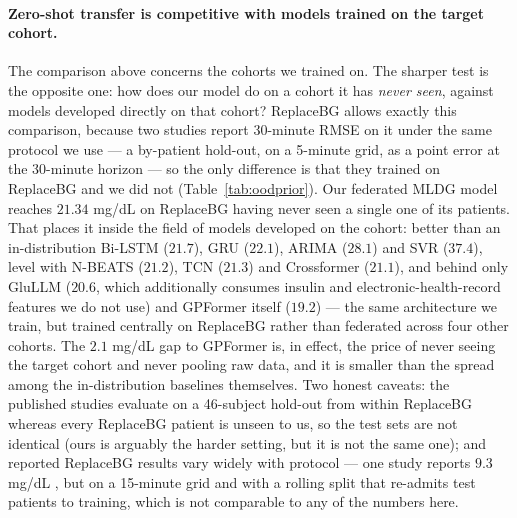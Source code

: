 \documentclass[10pt,letterpaper]{article}
\begin{document}
\paragraph{Zero-shot transfer is competitive with models trained on the target
cohort.} The comparison above concerns the cohorts we trained on. The sharper test
is the opposite one: how does our model do on a cohort it has \emph{never seen},
against models developed directly on that cohort? ReplaceBG allows exactly this
comparison, because two studies report 30-minute RMSE on it under the same
protocol we use --- a by-patient hold-out, on a 5-minute grid, as a point error at
the 30-minute horizon --- so the only difference is that they trained on ReplaceBG
and we did not (Table~\ref{tab:oodprior}). Our federated MLDG model reaches
$21.34$ mg/dL on ReplaceBG having never seen a single one of its patients. That
places it inside the field of models developed on the cohort: better than an
in-distribution Bi-LSTM ($21.7$), GRU ($22.1$), ARIMA ($28.1$) and SVR ($37.4$),
level with N-BEATS ($21.2$), TCN ($21.3$) and Crossformer ($21.1$), and behind
only GluLLM ($20.6$, which additionally consumes insulin and electronic-health-record
features we do not use) and GPFormer itself ($19.2$) --- the same architecture we
train, but trained centrally on ReplaceBG rather than federated across four other
cohorts. The $2.1$ mg/dL gap to GPFormer is, in effect, the price of never seeing
the target cohort and never pooling raw data, and it is smaller than the spread
among the in-distribution baselines themselves. Two honest caveats: the published
studies evaluate on a 46-subject hold-out from within ReplaceBG whereas every
ReplaceBG patient is unseen to us, so the test sets are not identical (ours is
arguably the harder setting, but it is not the same one); and reported ReplaceBG
results vary widely with protocol --- one study reports $9.3$ mg/dL
\cite{jaloli2023cnnlstm}, but on a 15-minute grid and with a rolling split that
re-admits test patients to training, which is not comparable to any of the numbers
here.
\end{document}
